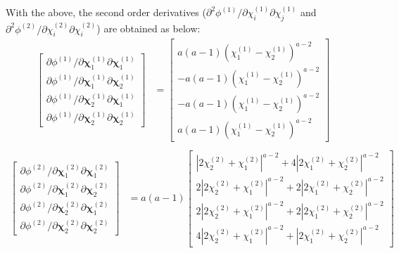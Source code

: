 \documentclass[12pt]{amsart}
\begin{document}
With the above, the second order derivatives ($\partial^2\phi^{(1)}/\partial\chi^{(1)}_i\partial\chi^{(1)}_j$ and $\partial^2\phi^{(2)}/\partial\chi^{(2)}_i\partial\chi^{(2)}_i$) are obtained as below:
\begin{equation}
  \label{eq:derivative_2_3}
  \begin{split}
    \begin{bmatrix}
      \partial\phi^{(1)}/\partial\mathbf{\chi}^{(1)}_1\partial\mathbf{\chi}^{(1)}_1\\
      \partial\phi^{(1)}/\partial\mathbf{\chi}^{(1)}_1\partial\mathbf{\chi}^{(1)}_2\\
      \partial\phi^{(1)}/\partial\mathbf{\chi}^{(1)}_2\partial\mathbf{\chi}^{(1)}_1\\
      \partial\phi^{(1)}/\partial\mathbf{\chi}^{(1)}_2\partial\mathbf{\chi}^{(1)}_2
    \end{bmatrix}
    &=
    \begin{bmatrix}
      a(a-1)(\chi^{(1)}_1-\chi^{(1)}_2)^{a-2}\\
      -a(a-1)(\chi^{(1)}_1-\chi^{(1)}_2)^{a-2}\\
      -a(a-1)(\chi^{(1)}_1-\chi^{(1)}_2)^{a-2}\\
      a(a-1)(\chi^{(1)}_1-\chi^{(1)}_2)^{a-2}
    \end{bmatrix}\\
  \end{split}
\end{equation}
\begin{equation}
  \label{eq:derivative_2_4}
  \begin{split}
    \begin{bmatrix}
      \partial\phi^{(2)}/\partial\mathbf{\chi}^{(2)}_1\partial\mathbf{\chi}^{(2)}_1\\
      \partial\phi^{(2)}/\partial\mathbf{\chi}^{(2)}_1\partial\mathbf{\chi}^{(2)}_2\\
      \partial\phi^{(2)}/\partial\mathbf{\chi}^{(2)}_2\partial\mathbf{\chi}^{(2)}_1\\
      \partial\phi^{(2)}/\partial\mathbf{\chi}^{(2)}_2\partial\mathbf{\chi}^{(2)}_2
    \end{bmatrix}
    &=a(a-1)
    \begin{bmatrix}
      |2\chi^{(2)}_2+\chi^{(2)}_1|^{a-2}+4|2\chi^{(2)}_1+\chi^{(2)}_2|^{a-2}\\
      2|2\chi^{(2)}_2+\chi^{(2)}_1|^{a-2}+2|2\chi^{(2)}_1+\chi^{(2)}_2|^{a-2}\\
      2|2\chi^{(2)}_2+\chi^{(2)}_1|^{a-2}+2|2\chi^{(2)}_1+\chi^{(2)}_2|^{a-2}\\
      4|2\chi^{(2)}_2+\chi^{(2)}_1|^{a-2}+|2\chi^{(2)}_1+\chi^{(2)}_2|^{a-2}
    \end{bmatrix}
  \end{split}
\end{equation}
\newline
\end{document}

